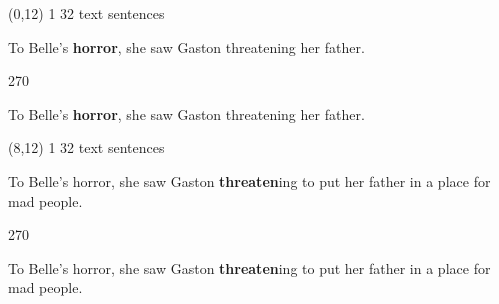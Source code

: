 \documentclass[a4paper]{article}
\newenvironment{itemize*}%
{\begin{itemize}%
 \setlength{\itemsep}{0.5cm}%
 \setlength{\parsep}{0pt}%
 \setlength{\parskip}{0pt}}%
{\end{itemize}}
\newcommand{\mycard}[3]{%
	\small #1 #2
	\par
	\parbox[t][6.8cm][c]{9.5cm}{%
	\par
	\myleft{#3}
	\par
	\myright{#3}
	}
}
\newcommand{\myleft}[1]{%
	\begin{sideways}
	\hspace*{-0.9cm}
		\parbox[t][2.7cm][t]{6.5cm}{%
		\large #1
		}
	\end{sideways}
}
\newcommand{\myright}[1]{%
	\hspace*{6.5cm}
	\begin{turn}{270}
	\hspace*{-7.1cm}
		\parbox[t][2.7cm][t]{6.5cm}{%
		\large #1
		}
	\end{turn}
}
\begin{document}
\begin{textblock}{8}(0,12)
\mycard{1}{32 text sentences}{
\begin{itemize*}
\item To Belle's \textbf{horror}, she saw Gaston threatening her father.
\end{itemize*}
}
\end{textblock}

\begin{textblock}{8}(8,12)
\mycard{1}{32 text sentences}{
\begin{itemize*}
\item To Belle's horror, she saw Gaston \textbf{threaten}ing to put her father in a place for mad people.
\end{itemize*}
}
\end{textblock}

\null
\newpage
\end{document}
